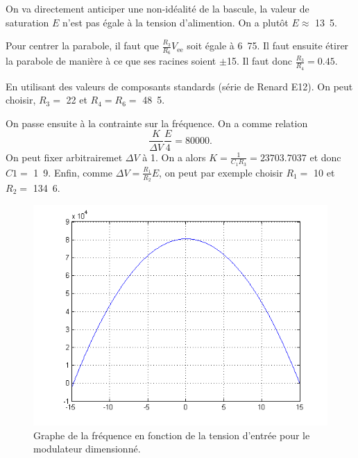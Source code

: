 On va directement anticiper une non-idéalité de la bascule,
la valeur de saturation $E$ n'est pas égale à la tension
d'alimention. On a plutôt $E \approx$ \unit{13.5}{\volt}.

Pour centrer la parabole, il faut que $\frac{R_3}{R_6}V_{\text{ee}}$
soit égale à \unit{6.75}{\volt}. Il faut ensuite étirer la
parabole de manière à ce que ses racines soient $\pm$\unit{15}{\volt}.
Il faut donc $\frac{R_3}{R_4} = 0.45$. 

En utilisant des valeurs de composants standards (série de Renard E12). 
On peut choisir, $R_3 =$ \unit{22}{\kilo\ohm} et $R_4 = R_6 =
$ \unit{48.5}{\kilo\ohm}.

On passe ensuite à la contrainte sur la fréquence. On a comme
relation 
\[ \frac{K}{\Delta V}\frac{E}{4} = 80000.\]
On peut fixer arbitrairemet $\Delta V$ à \unit{1}{\volt}. On a alors
$K = \frac{1}{C_1R_3} = 23703.7037$ et donc $C1 =$ \unit{1.9}{\nano\farad}.
Enfin, comme $\Delta V = \frac{R_1}{R_2}E$, on peut par exemple
choisir $R_1 =$ \unit{10}{\kilo\ohm} et $R_2 =$ \unit{134.6}{\kilo\ohm}.


\begin{figure}[ht]
	\centering
	\includegraphics[scale=0.7]{img/sigma-delta-f-vs-vref-dim.png}
	\caption{Graphe de la fréquence en fonction de la tension d'entrée pour
	le modulateur dimensionné.}
	\label{fig:sigma-delta-f-vs-vref-dim}
\end{figure}

